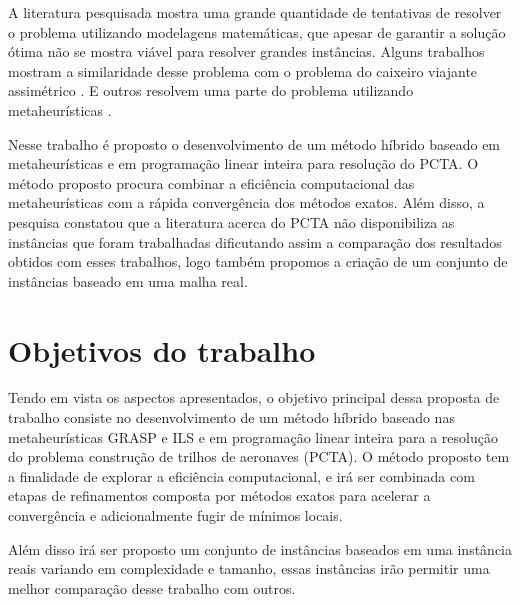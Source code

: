 	A literatura pesquisada \cite{ahmed2009} \cite{arguelo1007} \cite{cordeau2001}
	\cite{mohamed2011} \cite{abiliolivro} mostra uma grande quantidade de
	tentativas de resolver o problema utilizando modelagens matemáticas, que apesar
    de garantir a solução ótima não se mostra viável para resolver grandes
	instâncias. Alguns trabalhos mostram a similaridade desse problema com o
	problema do caixeiro viajante assimétrico \cite{clarke97}. E outros resolvem
	uma parte do problema utilizando metaheurísticas \cite{arguelo1007}.

	Nesse trabalho é proposto o desenvolvimento de um método híbrido baseado em
	metaheurísticas e em programação linear inteira para resolução do PCTA. O
	método proposto procura combinar a eficiência computacional das
	metaheurísticas com a rápida convergência dos métodos exatos. Além disso,
	a pesquisa constatou que a literatura acerca do PCTA não disponibiliza as
	instâncias que foram trabalhadas dificutando assim a comparação dos
	resultados obtidos com esses trabalhos, logo também propomos a criação de um
	conjunto de instâncias baseado em uma malha real.


\section {Objetivos do trabalho}

Tendo em vista os aspectos apresentados, o objetivo principal dessa proposta de trabalho consiste no desenvolvimento de um método híbrido baseado nas metaheurísticas GRASP e ILS e em programação linear inteira para a resolução do problema construção de trilhos de aeronaves (PCTA). O método proposto tem a finalidade de explorar a eficiência computacional, e irá ser combinada com etapas de refinamentos composta por métodos exatos para acelerar a convergência e adicionalmente fugir de mínimos locais.

Além disso irá ser proposto um conjunto de instâncias baseados em uma instância reais variando em complexidade e tamanho, essas instâncias irão permitir uma melhor comparação desse trabalho com outros.

